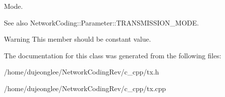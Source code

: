 Mode. 

\begin{DoxySeeAlso}{See also}
Network\+Coding\+::\+Parameter\+::\+T\+R\+A\+N\+S\+M\+I\+S\+S\+I\+O\+N\+\_\+\+M\+O\+DE. 
\end{DoxySeeAlso}
\begin{DoxyWarning}{Warning}
This member should be constant value. 
\end{DoxyWarning}


The documentation for this class was generated from the following files\+:\begin{DoxyCompactItemize}
\item 
/home/dujeonglee/\+Network\+Coding\+Rev/c\+\_\+cpp/tx.\+h\item 
/home/dujeonglee/\+Network\+Coding\+Rev/c\+\_\+cpp/tx.\+cpp\end{DoxyCompactItemize}
